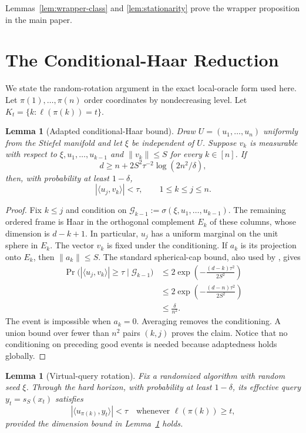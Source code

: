 \documentclass[twoside]{article}
\newtheorem{lemma}[theorem]{Lemma}
\begin{document}
Lemmas~\ref{lem:wrapper-class} and \ref{lem:stationarity} prove
the wrapper proposition in the main paper.

\section{The Conditional-Haar Reduction}
\label{app:rotation}

We state the random-rotation argument in the exact local-oracle form used here.
Let $\pi(1),\ldots,\pi(n)$ order coordinates by nondecreasing level. Let
$K_t=\{k:\ell(\pi(k))=t\}$.

\begin{lemma}[Adapted conditional-Haar bound]
\label{lem:adapted-haar}
Draw $U=(u_1,\ldots,u_n)$ uniformly from the Stiefel manifold and let $\xi$
be independent of $U$. Suppose $v_k$ is measurable with respect to
$\xi,u_1,\ldots,u_{k-1}$ and $\|v_k\|\leq S$ for every $k\in[n]$. If
\[
 d\geq n+2S^2\tau^{-2}\log(2n^2/\delta),
\]
then, with probability at least $1-\delta$,
\[
 |\langle u_j,v_k\rangle|<\tau,
 \qquad 1\leq k\leq j\leq n.
\]
\end{lemma}

\begin{proof}
Fix $k\leq j$ and condition on
$\mathcal G_{k-1}:=\sigma(\xi,u_1,\ldots,u_{k-1})$. The remaining ordered frame is Haar in the
orthogonal complement $E_k$ of these columns, whose dimension is
$d-k+1$. In particular, $u_j$ has a uniform marginal on the unit sphere in
$E_k$. The vector $v_k$ is fixed under the conditioning. If $a_k$ is its
projection onto $E_k$, then $\|a_k\|\leq S$. The standard spherical-cap
bound, also used by \citet[Appendix~B.3]{carmon2020stationary}, gives
\begin{align*}
 \Pr\bigl(|\langle u_j,v_k\rangle|\geq\tau
 \mid\mathcal G_{k-1}\bigr)
 &\leq 2\exp\left(-\frac{(d-k)\tau^2}{2S^2}\right)\\
 &\leq 2\exp\left(-\frac{(d-n)\tau^2}{2S^2}\right)\\
 &\leq\frac{\delta}{n^2}.
\end{align*}
The event is impossible when $a_k=0$. Averaging removes the conditioning.
A union bound over fewer than $n^2$ pairs $(k,j)$ proves the claim. Notice
that no conditioning on preceding good events is needed because adaptedness
holds globally.
\end{proof}

\begin{lemma}[Virtual-query rotation]
\label{lem:virtual}
Fix a randomized algorithm with random seed $\xi$. Through the hard horizon,
with probability at least $1-\delta$, its effective query $y_t=s_S(x_t)$
satisfies
\[
 |\langle u_{\pi(k)},y_t\rangle|<\tau
 \quad\text{whenever }\ell(\pi(k))\geq t,
\]
provided the dimension bound in Lemma~\ref{lem:adapted-haar} holds.
\end{lemma}
\end{document}
